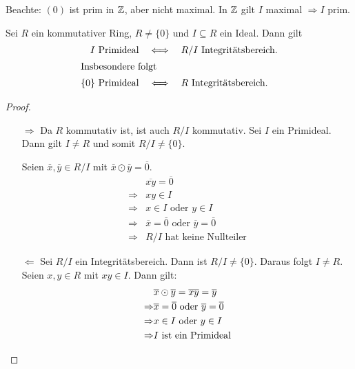 \documentclass[12pt,a4paper]{scrartcl}
\begin{document}
\begin{bem}
	Beachte: $(0)$ ist prim in $\mathbb Z$, aber nicht maximal. In $\mathbb Z$ gilt \glqq$I$ maximal $\Rightarrow I $ prim\grqq.
\end{bem}


\begin{satz} \label{thm:primitb}
	Sei $R$ ein kommutativer Ring, $R\neq\{0\}$ und $ I\subseteq R$ ein Ideal. Dann gilt
	\begin{align*} I \text{ Primideal} \quad &\Longleftrightarrow \quad R/I \text{ Integritätsbereich}. \\\intertext{Insbesondere folgt}
	 \text{$\{0\}$ Primideal} \quad&\Longleftrightarrow\quad \text{$R$ Integritätsbereich}.\end{align*}
\end{satz}

\begin{proof}
	\leavevmode
	\begin{itemize}
		\item[\glqq $\Rightarrow$\grqq] Da $R$ kommutativ ist, ist auch $R/I$ kommutativ.
		Sei $I$ ein Primideal. Dann gilt $I\neq R$ und somit $R/I \neq\{0\}$. 
		
		Seien $\overline{x}, \overline{y}\in R/I$ mit  $\overline{x}\odot\overline{y} = \overline{0}$.
		\begin{align*}
			&\overline{xy} = \overline{0} \\
			\Rightarrow& xy\in I \\
			\Rightarrow& x\in I \text{ oder } y\in I \\
			\Rightarrow& \overline{x} = \overline{0} \text{ oder } \overline{y} = \overline{0} \\
			\Rightarrow& R/I \text{ hat keine Nullteiler}
		\end{align*}
		
		\item[\glqq$\Leftarrow$\grqq] Sei $R/I$ ein Integritätsbereich. Dann ist $R/I \neq \{0\}$. Daraus folgt $I \neq R$. Seien $x,y\in R$ mit $xy\in I$. Dann gilt:
		\begin{align*}
			&\overline{x}\odot\overline{y} = \overline{xy} = \overline{y} \\
			\Rightarrow& \overline{x} = \overline{0} \text{ oder } \overline{y} = \overline{0} \\
			\Rightarrow& x\in I \text{ oder } y\in I \\
			\Rightarrow& I \text{ ist ein Primideal}
    \qedhere
		\end{align*}
	\end{itemize}
\end{proof}
\end{document}
